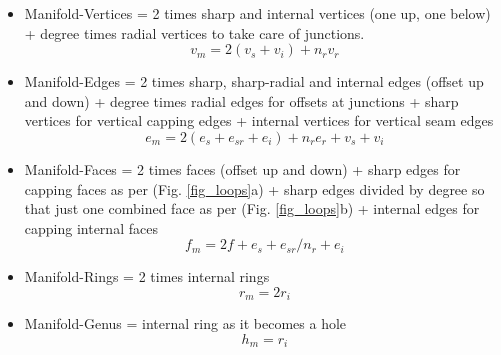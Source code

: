 \begin{itemize}
[noitemsep,topsep=2pt,parsep=2pt,partopsep=2pt,label=\textbullet,leftmargin=*]
\item Manifold-Vertices = 2 times sharp and internal vertices (one up, one below) + degree times radial vertices to take care of junctions.
\begin{equation}
v_m = 2 (v_s + v_i) + n_r v_r \label{eqn_vm}
\end{equation}
\item Manifold-Edges = 2 times sharp, sharp-radial and internal edges (offset up and down) + degree times radial edges for offsets at junctions + sharp vertices for vertical capping edges + internal vertices for vertical seam edges
\begin{equation}
e_m = 2 (e_s + e_{sr} + e_i) + n_r e_r  + v_s + v_i\label{eqn_em}
\end{equation}
\item Manifold-Faces = 2 times faces (offset up and down) + sharp edges for capping faces as per  (Fig. \ref{fig_loops}a) + sharp edges divided by degree so that just one combined face as per  (Fig. \ref{fig_loops}b) + internal edges for capping internal faces
\begin{equation}
f_m = 2f + e_s + e_{sr}/n_r + e_i \label{eqn_fm}
\end{equation}
\item Manifold-Rings = 2 times internal rings
\begin{equation}
r_m = 2r_i\label{eqn_rm}
\end{equation}
\item Manifold-Genus = internal ring as it becomes a hole
\begin{equation}
h_m = r_i\label{eqn_hm}
\end{equation}

\end{itemize}
%
